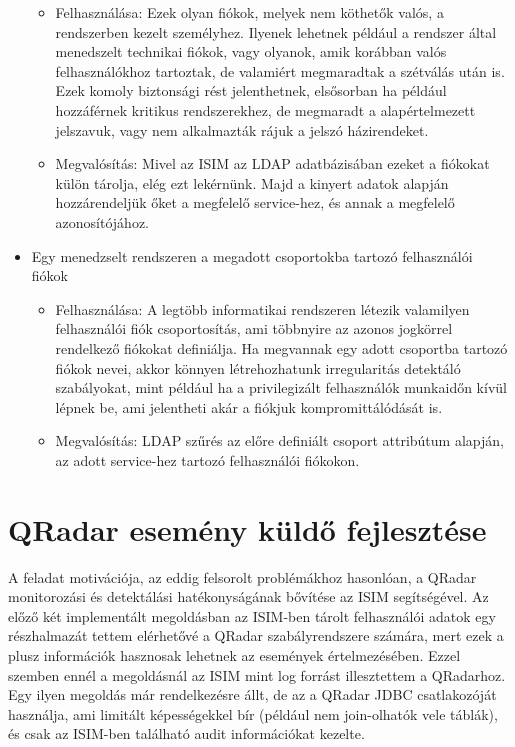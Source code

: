 \begin{itemize}
	\begin{itemize}
		\small
		\item Felhasználása: Ezek olyan fiókok, melyek nem köthetők valós, a rendszerben kezelt személyhez. Ilyenek lehetnek például a rendszer által menedszelt technikai fiókok, vagy olyanok, amik korábban valós felhasználókhoz tartoztak, de valamiért megmaradtak a szétválás után is. Ezek komoly biztonsági rést jelenthetnek, elsősorban ha például hozzáférnek kritikus rendszerekhez, de megmaradt a alapértelmezett jelszavuk, vagy nem alkalmazták rájuk a jelszó házirendeket.
		\item Megvalósítás: Mivel az ISIM az LDAP adatbázisában ezeket a fiókokat külön tárolja, elég ezt lekérnünk. Majd a kinyert adatok alapján hozzárendeljük őket a megfelelő service-hez, és annak a megfelelő azonosítójához.
	\end{itemize}
	\item Egy menedzselt rendszeren a megadott csoportokba tartozó felhasználói fiókok
	\begin{itemize}
		\small
		\item Felhasználása: A legtöbb informatikai rendszeren létezik valamilyen felhasználói fiók csoportosítás, ami többnyire az azonos jogkörrel rendelkező fiókokat definiálja. Ha megvannak egy adott csoportba tartozó fiókok nevei, akkor könnyen létrehozhatunk irregularitás detektáló szabályokat, mint például ha a privilegizált felhasználók munkaidőn kívül lépnek be, ami jelentheti akár a fiókjuk kompromittálódását is.
		\item Megvalósítás: LDAP szűrés az előre definiált csoport attribútum alapján, az adott service-hez tartozó felhasználói fiókokon.
	\end{itemize}
	
\end{itemize}
\section{QRadar esemény küldő fejlesztése}
A feladat motivációja, az eddig felsorolt problémákhoz hasonlóan, a QRadar monitorozási és detektálási hatékonyságának bővítése az ISIM segítségével. Az előző két implementált megoldásban az ISIM-ben tárolt felhasználói adatok egy részhalmazát tettem elérhetővé a QRadar szabályrendszere számára, mert ezek a plusz információk hasznosak lehetnek az események értelmezésében. Ezzel szemben ennél a megoldásnál az ISIM mint log forrást illesztettem a QRadarhoz. Egy ilyen megoldás már rendelkezésre állt, de az a QRadar JDBC csatlakozóját használja, ami limitált képességekkel bír (például nem join-olhatók vele táblák), és csak az ISIM-ben található audit információkat kezelte.

